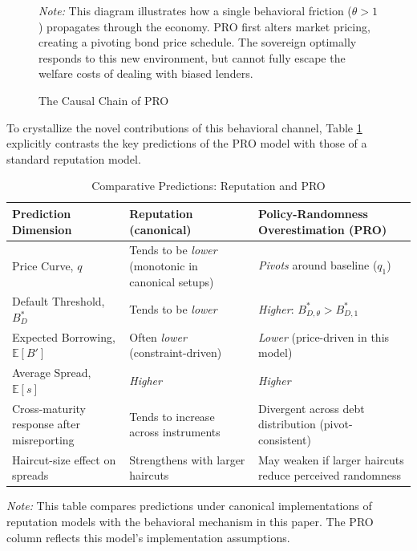 \documentclass[12pt]{article}
\theoremstyle{plain}
\begin{document}
\begin{figure}[htb]
\begin{tikzpicture}
	\end{tikzpicture}
	\caption{The Causal Chain of PRO}
	\label{fig:causal_chain}
	\parbox{\linewidth}{\small\textit{Note:} This diagram illustrates how a single behavioral friction ($\theta > 1$) propagates through the economy. PRO first alters market pricing, creating a pivoting bond price schedule. The sovereign optimally responds to this new environment, but cannot fully escape the welfare costs of dealing with biased lenders.}
\end{figure}
To crystallize the novel contributions of this behavioral channel, Table
\ref{tab:prediction_comparison} explicitly contrasts the key predictions of the
PRO model with those of a standard reputation model.

\begin{table}[h!]
	\centering
	\caption{Comparative Predictions: Reputation and PRO}
	\label{tab:prediction_comparison}
	\begin{tabularx}{\textwidth}{@{}lXX@{}}
		\toprule
		Prediction Dimension                       & Reputation (canonical) \citet{ColeDowEnglish1995, MorelliMoretti2023} & Policy-Randomness Overestimation (PRO)                    \\ \midrule
		Price Curve, $q$                           & Tends to be \textit{lower} (monotonic in canonical setups)            & \textit{Pivots} around baseline ($q_1$)                   \\
		Default Threshold, $B^*_D$                 & Tends to be \textit{lower}                                            & \textit{Higher}: $B^*_{D,\theta} > B^*_{D,1}$             \\
		Expected Borrowing, $\mathbb{E}[B']$       & Often \textit{lower} (constraint-driven)                              & \textit{Lower} (price-driven in this model)               \\
		Average Spread, $\mathbb{E}[s]$            & \textit{Higher}                                                       & \textit{Higher}                                           \\
		Cross-maturity response after misreporting & Tends to increase across instruments                                  & Divergent across debt distribution (pivot-consistent)     \\
		Haircut-size effect on spreads             & Strengthens with larger haircuts \citet{AmadorPhelan2023}             & May weaken if larger haircuts reduce perceived randomness \\\bottomrule
	\end{tabularx}
	\parbox{\linewidth}{\small\textit{Note:} This table compares predictions under canonical implementations of reputation models with the behavioral mechanism in this paper. The PRO column reflects this model's implementation assumptions.}
\end{table}
\end{document}
